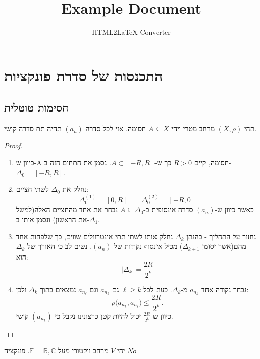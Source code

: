 \documentclass{tstextbook}
\begin{document}
\title{Example Document}
\author{HTML2LaTeX Converter}
\maketitle

\chapter{התכנסות של סדרת פונקציות}

\section{חסימות טוטלית}

\begin{proposition}
תהי \((X,\rho)\) מרחב מטרי ויהי \(A\subseteq X\) חסומה. אזי לכל סדרה \((a_{n})\) תהיה תת סדרה קושי.

\end{proposition}
\begin{proof}
  \begin{enumerate}
    \item כיוון ש-A חסומה, קיים \(R> 0\) כך ש-\(A\subset [-R,R]\). נסמן את התחום הזה ב-\(\Delta_{0}=[-R,R]\). 


    \item נחלק את \(\Delta_{0}\) לשתי חציים: 
$$\Delta_{0}^{(1)}=[0,R]\qquad \Delta_{0}^{(2)}=[-R,0]$$
כאשר כיוון ש-\((a_{n})\) סדרה אינסופית ב-\(A\subseteq \Delta_{0}\) נבחר את אחד מהחציים האלה(למשל את הראשון) ונסמן אותו ב-\(\Delta_{1}\).


    \item נחזור על התהליך - בהנתן \(\Delta_{k}\) נחלק אותו לשתי תתי אינטרוולים שווים, כך שלפחות אחד מהם(אשר יסומן \(\Delta_{k+1}\)) מכיל אינסוף נקודות של \((a_{n})\). נשים לב כי האורך של \(\Delta_{k}\) הוא: 
$$\lvert \Delta_{k} \rvert =\frac{2R}{2^{k}}$$


    \item נבחר נקודה אחד \(a_{n_{k}}\) מ-\(\Delta_{k}\). כעת לכל \(\ell \geq k\) גם \(a_{n_{k}}\) וגם \(a_{n_{\ell}}\) נמצאים בתוך \(\Delta_{k}\) ולכן: 
$$\rho\bigl(a_{n_{k}},a_{n_{\ell}}\bigr)\leq\frac{2R}{2^{k}}.$$
כיוון ש-\(\frac{2R}{2^{k}}\) יכול להיות קטן כרצונינו נקבל כי \((a_{n_{k}})\) קושי.


  \end{enumerate}
\end{proof}
\begin{definition}
יהי \(V\) מרחב ווקטורי מעל \(\mathbb{F}=\mathbb{R},\mathbb{C}\).  פונקציה \(No\)

\end{definition}
\end{document}
